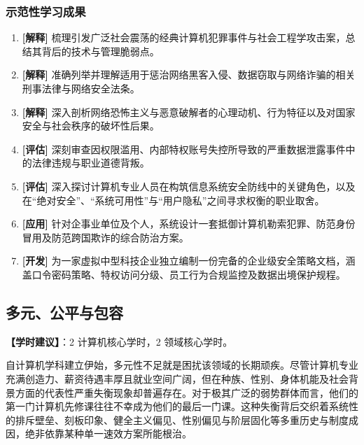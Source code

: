 \subsubsection{示范性学习成果}
\begin{enumerate}
    \item \textbf{[解释]} 梳理引发广泛社会震荡的经典计算机犯罪事件与社会工程学攻击案，总结其背后的技术与管理脆弱点。
    \item \textbf{[解释]} 准确列举并理解适用于惩治网络黑客入侵、数据窃取与网络诈骗的相关刑事法律与网络安全法条。
    \item \textbf{[解释]} 深入剖析网络恐怖主义与恶意破解者的心理动机、行为特征以及对国家安全与社会秩序的破坏性后果。
    \item \textbf{[评估]} 深刻审查因权限滥用、内部特权账号失控所导致的严重数据泄露事件中的法律违规与职业道德背叛。
    \item \textbf{[评估]} 深入探讨计算机专业人员在构筑信息系统安全防线中的关键角色，以及在“绝对安全”、“系统可用性”与“用户隐私”之间寻求权衡的职业取舍。
    \item \textbf{[应用]} 针对企事业单位及个人，系统设计一套抵御计算机勒索犯罪、防范身份冒用及防范跨国欺诈的综合防治方案。
    \item \textbf{[开发]} 为一家虚拟中型科技企业独立编制一份完备的企业级安全策略文档，涵盖口令密码策略、特权访问分级、员工行为合规监控及数据出境保护规程。
\end{enumerate}

\subsection{多元、公平与包容}
\textbf{【学时建议】}：2 计算机核心学时，2 领域核心学时。

自计算机学科建立伊始，多元性不足就是困扰该领域的长期顽疾。尽管计算机专业充满创造力、薪资待遇丰厚且就业空间广阔，但在种族、性别、身体机能及社会背景方面的代表性严重失衡现象却普遍存在。对于极其广泛的弱势群体而言，他们的第一门计算机先修课往往不幸成为他们的最后一门课。这种失衡背后交织着系统性的排斥壁垒、刻板印象、健全主义偏见、性别偏见与阶层固化等多重历史与制度成因，绝非依靠某种单一速效方案所能根治。

